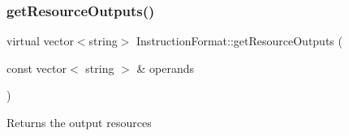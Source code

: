 \mbox{\label{classInstructionFormat_a95cd28ffb1bde59b67f676880ab10536}} 
\subsubsection{\texorpdfstring{get\+Resource\+Outputs()}{getResourceOutputs()}}
{\footnotesize\ttfamily virtual vector$<$string$>$ Instruction\+Format\+::get\+Resource\+Outputs (\begin{DoxyParamCaption}\item[{const vector$<$ string $>$ \&}]{operands }\end{DoxyParamCaption})\hspace{0.3cm}{\ttfamily [pure virtual]}}

Returns the output resources 

